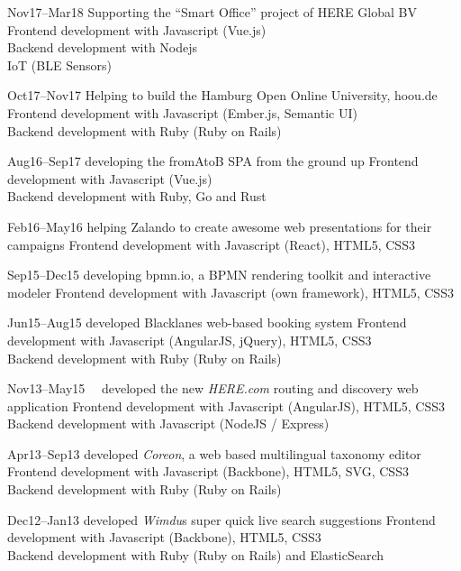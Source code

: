\documentclass[]{friggeri-cv}
\begin{document}
\begin{entrylist}
  \entry
    {Nov17–Mar18}
    {Supporting the “Smart Office” project of HERE Global BV}
    {}
    {Frontend development with Javascript (Vue.js)\\
     Backend development with Nodejs\\
     IoT (BLE Sensors)}

  \entry
    {Oct17–Nov17}
    {Helping to build the Hamburg Open Online University, hoou.de}
    {}
    {Frontend development with Javascript (Ember.js, Semantic UI)\\
     Backend development with Ruby (Ruby on Rails)}

  \entry
    {Aug16–Sep17}
    {developing the fromAtoB SPA from the ground up}
    {}
    {Frontend development with Javascript (Vue.js)\\
     Backend development with Ruby, Go and Rust}

  \entry
    {Feb16–May16}
    {helping Zalando to create awesome web presentations for their campaigns}
    {}
    {Frontend development with Javascript (React), HTML5, CSS3}

  \entry
    {Sep15–Dec15}
    {developing bpmn.io, a BPMN rendering toolkit and interactive modeler}
    {}
    {Frontend development with Javascript (own framework), HTML5, CSS3}

  \entry
    {Jun15–Aug15}
    {developed Blacklanes web-based booking system}
    {}
    {Frontend development with Javascript (AngularJS, jQuery), HTML5, CSS3\\
     Backend development with Ruby (Ruby on Rails)}

  \entry
    {Nov13–May15~~}
    {developed the new \emph{HERE.com} routing and discovery web application}
    {}
    {Frontend development with Javascript (AngularJS), HTML5, CSS3\\
     Backend development with Javascript (NodeJS / Express)}

  \entry
    {Apr13–Sep13}
    {developed \emph{Coreon}, a web based multilingual taxonomy editor}
    {}
    {Frontend development with Javascript (Backbone), HTML5, SVG, CSS3\\
     Backend development with Ruby (Ruby on Rails)}

  \entry
    {Dec12–Jan13}
    {developed \emph{Wimdu}s super quick live search suggestions}
    {}
    {Frontend development with Javascript (Backbone), HTML5, CSS3\\
     Backend development with Ruby (Ruby on Rails) and ElasticSearch}


\end{entrylist}
\end{document}
